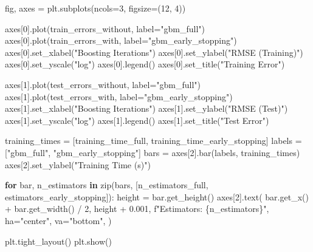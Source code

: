 \documentclass[
  letterpaper,
  DIV=11,
  numbers=noendperiod]{scrreprt}
\newenvironment{Shaded}{\begin{snugshade}}{\end{snugshade}}
\newcommand{\BuiltInTok}[1]{\textcolor[rgb]{0.00,0.23,0.31}{#1}}
\newcommand{\ControlFlowTok}[1]{\textcolor[rgb]{0.00,0.23,0.31}{\textbf{#1}}}
\newcommand{\DecValTok}[1]{\textcolor[rgb]{0.68,0.00,0.00}{#1}}
\newcommand{\FloatTok}[1]{\textcolor[rgb]{0.68,0.00,0.00}{#1}}
\newcommand{\KeywordTok}[1]{\textcolor[rgb]{0.00,0.23,0.31}{\textbf{#1}}}
\newcommand{\NormalTok}[1]{\textcolor[rgb]{0.00,0.23,0.31}{#1}}
\newcommand{\OperatorTok}[1]{\textcolor[rgb]{0.37,0.37,0.37}{#1}}
\newcommand{\SpecialCharTok}[1]{\textcolor[rgb]{0.37,0.37,0.37}{#1}}
\newcommand{\SpecialStringTok}[1]{\textcolor[rgb]{0.13,0.47,0.30}{#1}}
\newcommand{\StringTok}[1]{\textcolor[rgb]{0.13,0.47,0.30}{#1}}
\begin{document}
\begin{Shaded}
\begin{Highlighting}[]
\NormalTok{fig, axes }\OperatorTok{=}\NormalTok{ plt.subplots(ncols}\OperatorTok{=}\DecValTok{3}\NormalTok{, figsize}\OperatorTok{=}\NormalTok{(}\DecValTok{12}\NormalTok{, }\DecValTok{4}\NormalTok{))}

\NormalTok{axes[}\DecValTok{0}\NormalTok{].plot(train\_errors\_without, label}\OperatorTok{=}\StringTok{"gbm\_full"}\NormalTok{)}
\NormalTok{axes[}\DecValTok{0}\NormalTok{].plot(train\_errors\_with, label}\OperatorTok{=}\StringTok{"gbm\_early\_stopping"}\NormalTok{)}
\NormalTok{axes[}\DecValTok{0}\NormalTok{].set\_xlabel(}\StringTok{"Boosting Iterations"}\NormalTok{)}
\NormalTok{axes[}\DecValTok{0}\NormalTok{].set\_ylabel(}\StringTok{"RMSE (Training)"}\NormalTok{)}
\NormalTok{axes[}\DecValTok{0}\NormalTok{].set\_yscale(}\StringTok{"log"}\NormalTok{)}
\NormalTok{axes[}\DecValTok{0}\NormalTok{].legend()}
\NormalTok{axes[}\DecValTok{0}\NormalTok{].set\_title(}\StringTok{"Training Error"}\NormalTok{)}

\NormalTok{axes[}\DecValTok{1}\NormalTok{].plot(test\_errors\_without, label}\OperatorTok{=}\StringTok{"gbm\_full"}\NormalTok{)}
\NormalTok{axes[}\DecValTok{1}\NormalTok{].plot(test\_errors\_with, label}\OperatorTok{=}\StringTok{"gbm\_early\_stopping"}\NormalTok{)}
\NormalTok{axes[}\DecValTok{1}\NormalTok{].set\_xlabel(}\StringTok{"Boosting Iterations"}\NormalTok{)}
\NormalTok{axes[}\DecValTok{1}\NormalTok{].set\_ylabel(}\StringTok{"RMSE (Test)"}\NormalTok{)}
\NormalTok{axes[}\DecValTok{1}\NormalTok{].set\_yscale(}\StringTok{"log"}\NormalTok{)}
\NormalTok{axes[}\DecValTok{1}\NormalTok{].legend()}
\NormalTok{axes[}\DecValTok{1}\NormalTok{].set\_title(}\StringTok{"Test Error"}\NormalTok{)}

\NormalTok{training\_times }\OperatorTok{=}\NormalTok{ [training\_time\_full, training\_time\_early\_stopping]}
\NormalTok{labels }\OperatorTok{=}\NormalTok{ [}\StringTok{"gbm\_full"}\NormalTok{, }\StringTok{"gbm\_early\_stopping"}\NormalTok{]}
\NormalTok{bars }\OperatorTok{=}\NormalTok{ axes[}\DecValTok{2}\NormalTok{].bar(labels, training\_times)}
\NormalTok{axes[}\DecValTok{2}\NormalTok{].set\_ylabel(}\StringTok{"Training Time (s)"}\NormalTok{)}

\ControlFlowTok{for}\NormalTok{ bar, n\_estimators }\KeywordTok{in} \BuiltInTok{zip}\NormalTok{(bars, [n\_estimators\_full, estimators\_early\_stopping]):}
\NormalTok{    height }\OperatorTok{=}\NormalTok{ bar.get\_height()}
\NormalTok{    axes[}\DecValTok{2}\NormalTok{].text(}
\NormalTok{        bar.get\_x() }\OperatorTok{+}\NormalTok{ bar.get\_width() }\OperatorTok{/} \DecValTok{2}\NormalTok{,}
\NormalTok{        height }\OperatorTok{+} \FloatTok{0.001}\NormalTok{,}
        \SpecialStringTok{f"Estimators: }\SpecialCharTok{\{}\NormalTok{n\_estimators}\SpecialCharTok{\}}\SpecialStringTok{"}\NormalTok{,}
\NormalTok{        ha}\OperatorTok{=}\StringTok{"center"}\NormalTok{,}
\NormalTok{        va}\OperatorTok{=}\StringTok{"bottom"}\NormalTok{,}
\NormalTok{    )}

\NormalTok{plt.tight\_layout()}
\NormalTok{plt.show()}
\end{Highlighting}
\end{Shaded}
\end{document}
